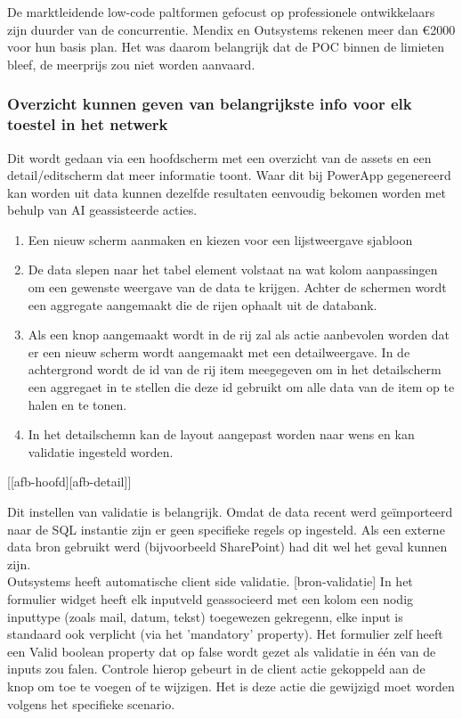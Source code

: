 De marktleidende low-code paltformen gefocust op professionele ontwikkelaars zijn duurder van de concurrentie. Mendix en Outsystems rekenen meer dan \euro2000 voor hun basis plan. Het was daarom belangrijk dat de POC binnen de limieten bleef, de meerprijs zou niet worden aanvaard.

\subsubsection{Overzicht kunnen geven van belangrijkste info voor elk toestel in het netwerk}

Dit wordt gedaan via een hoofdscherm met een overzicht van de assets en een detail/editscherm dat meer informatie toont.
Waar dit bij PowerApp gegenereerd kan worden uit data kunnen dezelfde resultaten eenvoudig bekomen worden met behulp van AI geassisteerde acties.
\begin{enumerate}
    \item Een nieuw scherm aanmaken en kiezen voor een lijstweergave sjabloon
    \item De data slepen naar het tabel element volstaat na wat kolom aanpassingen om een gewenste weergave van de data te krijgen. Achter de schermen wordt een aggregate aangemaakt die de rijen ophaalt uit de databank.
    \item Als een knop aangemaakt wordt in de rij zal als actie aanbevolen worden dat er een nieuw scherm wordt aangemaakt met een detailweergave. In de achtergrond wordt de id van de rij item meegegeven om in het detailscherm een aggregaet in te stellen die deze id gebruikt om alle data van de item op te halen en te tonen.
    \item In het detailschemn kan de layout aangepast worden naar wens en kan validatie ingesteld worden.
\end{enumerate}

[[afb-hoofd][afb-detail]]

Dit instellen van validatie is belangrijk. Omdat de data recent werd geïmporteerd naar de SQL instantie zijn er geen specifieke regels op ingesteld. Als een externe data bron gebruikt werd (bijvoorbeeld SharePoint) had dit wel het geval kunnen zijn.\\
Outsystems heeft automatische client side validatie. [bron-validatie] In het formulier widget heeft elk inputveld geassocieerd met een kolom een nodig inputtype (zoals mail, datum, tekst) toegewezen gekregenn, elke input is standaard ook verplicht (via het 'mandatory' property). Het formulier zelf heeft een Valid boolean property dat op false wordt gezet als validatie in één van de inputs zou falen. Controle hierop gebeurt in de client actie gekoppeld aan de knop om toe te voegen of te wijzigen. Het is deze actie die gewijzigd moet worden volgens het specifieke scenario.

